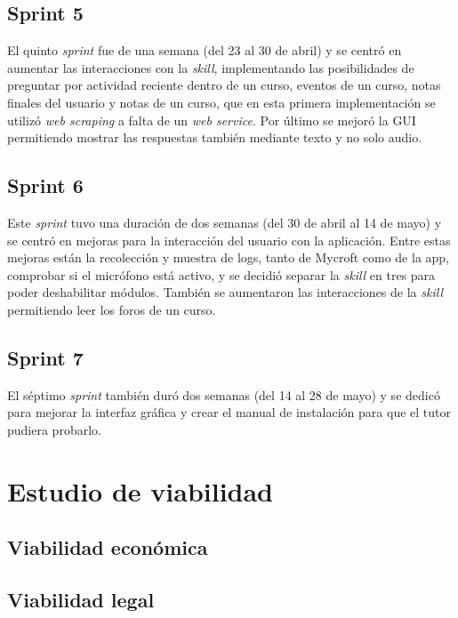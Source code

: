 \subsection{Sprint 5}

El quinto \textit{sprint} fue de una semana (del 23 al 30 de abril) y se centró en aumentar las interacciones con la \textit{skill}, implementando las posibilidades de preguntar por actividad reciente dentro de un curso, eventos de un curso, notas finales del usuario y notas de un curso, que en esta primera implementación se utilizó \textit{web scraping} a falta de un \textit{web service}. Por último se mejoró la GUI permitiendo mostrar las respuestas también mediante texto y no solo audio.

\subsection{Sprint 6}

Este \textit{sprint} tuvo una duración de dos semanas (del 30 de abril al 14 de mayo) y se centró en mejoras para la interacción del usuario con la aplicación. Entre estas mejoras están la recolección y muestra de logs, tanto de Mycroft como de la app, comprobar si el micrófono está activo, y se decidió separar la \textit{skill} en tres para poder deshabilitar módulos. También se aumentaron las interacciones de la \textit{skill} permitiendo leer los foros de un curso.

\subsection{Sprint 7}

El séptimo \textit{sprint} también duró dos semanas (del 14 al 28 de mayo) y se dedicó para mejorar la interfaz gráfica y crear el manual de instalación para que el tutor pudiera probarlo.



\section{Estudio de viabilidad}

\subsection{Viabilidad económica}

\subsection{Viabilidad legal}